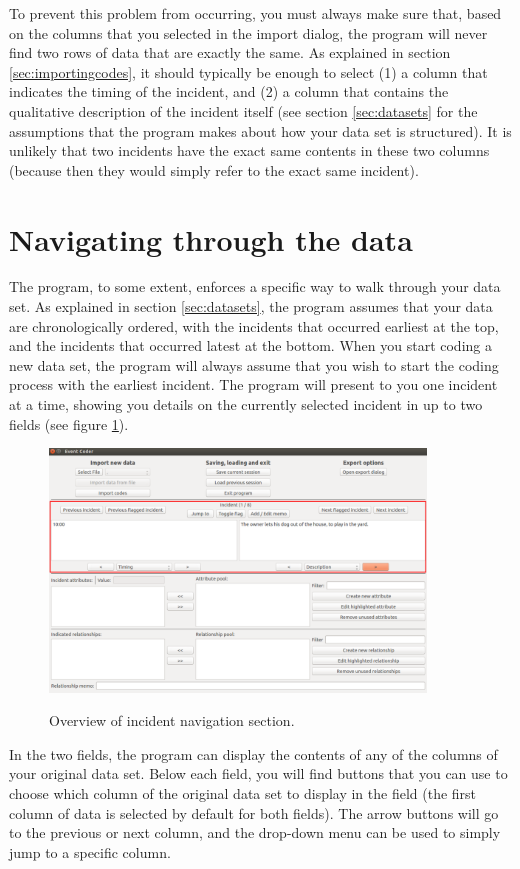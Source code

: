 \documentclass{memoir}
\begin{document}
To prevent this problem from occurring, you must always make sure that, based on the columns that you selected in the import dialog, the program will never find two rows of data that are exactly the same. As explained in section \ref{sec:importingcodes}, it should typically be enough to select (1) a column that indicates the timing of the incident, and (2) a column that contains the qualitative description of the incident itself (see section \ref{sec:datasets} for the assumptions that the program makes about how your data set is structured). It is unlikely that two incidents have the exact same contents in these two columns (because then they would simply refer to the exact same incident).

\section{Navigating through the data}
\label{sec:navigatingdata}

The program, to some extent, enforces a specific way to walk through your data set. As explained in section \ref{sec:datasets}, the program assumes that your data are chronologically ordered, with the incidents that occurred earliest at the top, and the incidents that occurred latest at the bottom. When you start coding a new data set, the program will always assume that you wish to start the coding process with the earliest incident. The program will present to you one incident at a time, showing you details on the currently selected incident in up to two fields (see figure \ref{fig:incidentsoverview}). 

\begin{figure}[h!]
  \centering
  \caption{Overview of incident navigation section.}
  \includegraphics[width=100mm]{Screenshot_4.pdf}
  \label{fig:incidentsoverview}
\end{figure}

In the two fields, the program can display the contents of any of the columns of your original data set. Below each field, you will find buttons that you can use to choose which column of the original data set to display in the field (the first column of data is selected by default for both fields). The arrow buttons will go to the previous or next column, and the drop-down menu can be used to simply jump to a specific column. 
\end{document}

